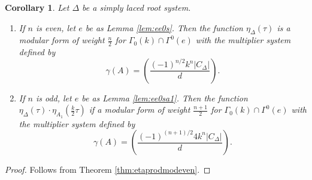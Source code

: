 \documentclass[11pt,a4paper]{amsart}
\newtheorem{corollary}[theorem]{Corollary}
\theoremstyle{definition}
\begin{document}
\begin{corollary}  Let $\Delta$ be a simply laced root system. 
\begin{enumerate}
\item If $n$ is even, let $e$ be as Lemma \ref{lem:ee0s}. Then the function $\eta_{\Delta}(\tau)$ is a modular form of weight $\frac{n}{2}$ for $\Gamma_0(k)\cap\Gamma^0(e)$ with the multiplier system defined by
\[ \gamma(A)=\left( \frac{(-1)^{n/2}k^n|C_{\Delta}|}{d} \right). \]
\item If $n$ is odd, let $e$ be as Lemma \ref{lem:ee0sa1}. Then the function $\eta_{\Delta}(\tau) \cdot \eta_{A_1}(\frac{k}{2}\tau)$ if a modular form of weight $\frac{n+1}{2}$ for $\Gamma_0(k)\cap\Gamma^0(e)$ with the multiplier system defined by
\[ \gamma(A)=\left( \frac{(-1)^{(n+1)/2}4k^n|C_{\Delta}|}{d} \right). \]
\end{enumerate}
\label{cor:etamultsyscalc}
\end{corollary}
\begin{proof} Follows from Theorem \ref{thm:etaprodmodeven}.
\end{proof}
\end{document}
